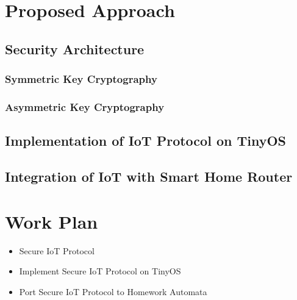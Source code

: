 \documentclass{mprop}
\begin{document}
\section{Proposed Approach}

\subsection{Security Architecture} %
\label{sub:security_architecture}

\subsubsection{Symmetric Key Cryptography} %
\label{ssub:symmetric_key_cryptography}

\subsubsection{Asymmetric Key Cryptography} %
\label{ssub:asymmetric_key_cryptography}


\subsection{Implementation of IoT Protocol on TinyOS} %
\label{sub:implementation_of_iot_protocol_on_tinyos}


\subsection{Integration of IoT with Smart Home Router} %
\label{sub:implementation_of_iot_on_smart_home_router}

\section{Work Plan}

\begin{itemize}
    \item Secure IoT Protocol
    \item Implement Secure IoT Protocol on TinyOS
    \item Port Secure IoT Protocol to Homework Automata
\end{itemize}



\end{document}
